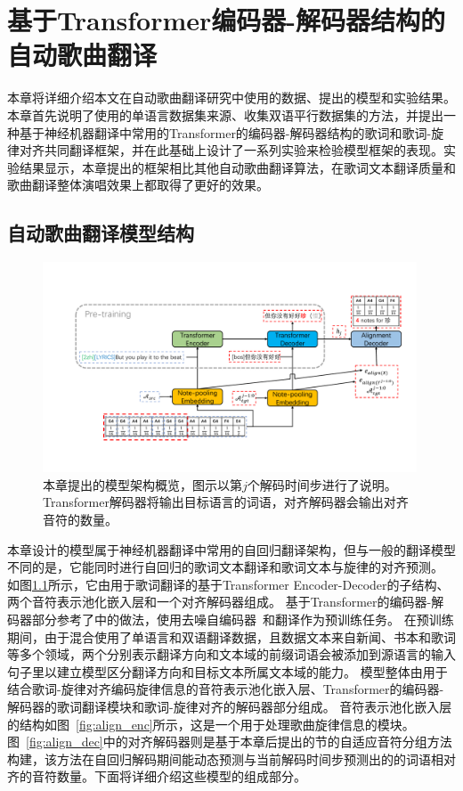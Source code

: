\newcommand{\modelname}{LTAG}
\chapter{基于Transformer编码器-解码器结构的自动歌曲翻译}
\label{sec:ast}
本章将详细介绍本文在自动歌曲翻译研究中使用的数据、提出的模型和实验结果。本章首先说明了使用的单语言数据集来源、收集双语平行数据集的方法，并提出一种基于神经机器翻译中常用的Transformer的编码器-解码器结构的歌词和歌词-旋律对齐共同翻译框架，并在此基础上设计了一系列实验来检验模型框架的表现。实验结果显示，本章提出的框架相比其他自动歌曲翻译算法，在歌词文本翻译质量和歌曲翻译整体演唱效果上都取得了更好的效果。
\section{自动歌曲翻译模型结构}
\begin{figure}[ht]
    \centering
    \includegraphics[width=0.99\textwidth]{figure/ast/pipeline.pdf}
    \caption{本章提出的模型架构概览，图示以第$j$个解码时间步进行了说明。Transformer解码器将输出目标语言的词语，对齐解码器会输出对齐音符的数量。}
    \label{fig:model}
\end{figure}
本章设计的模型属于神经机器翻译中常用的自回归翻译架构，但与一般的翻译模型不同的是，它能同时进行自回归的歌词文本翻译和歌词文本与旋律的对齐预测。
如图\ref{fig:model}所示，它由用于歌词翻译的基于Transformer Encoder-Decoder的子结构、两个音符表示池化嵌入层和一个对齐解码器组成。
基于Transformer的编码器-解码器部分参考了\citet{gagast}中的做法，使用去噪自编码器~\citep{bart}和翻译作为预训练任务。
在预训练期间，由于混合使用了单语言和双语翻译数据，且数据文本来自新闻、书本和歌词等多个领域，两个分别表示翻译方向和文本域的前缀词语会被添加到源语言的输入句子里以建立模型区分翻译方向和目标文本所属文本域的能力。
模型整体由用于结合歌词-旋律对齐编码旋律信息的音符表示池化嵌入层、Transformer的编码器-解码器的歌词翻译模块和歌词-旋律对齐的解码器部分组成。
音符表示池化嵌入层的结构如图~\ref{fig:align_enc}所示，这是一个用于处理歌曲旋律信息的模块。
图~\ref{fig:align_dec}中的对齐解码器则是基于本章后提出的节的自适应音符分组方法构建，该方法在自回归解码期间能动态预测与当前解码时间步预测出的的词语相对齐的音符数量。下面将详细介绍这些模型的组成部分。
